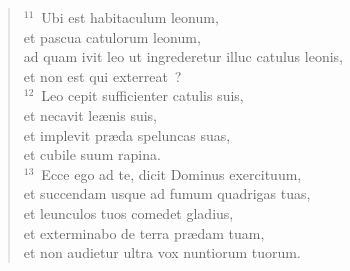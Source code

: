 \begin{flushleft}
\begin{verse}
${}^{11}$~Ubi est habitaculum leonum,\\ et pascua catulorum leonum,\\ ad quam ivit leo ut ingrederetur illuc catulus leonis,\\ et non est qui exterreat~?\\
${}^{12}$~Leo cepit sufficienter catulis suis,\\ et necavit le\ae nis suis,\\ et implevit pr\ae da speluncas suas,\\ et cubile suum rapina.\\
${}^{13}$~Ecce ego ad te, dicit Dominus exercituum,\\ et succendam usque ad fumum quadrigas tuas,\\ et leunculos tuos comedet gladius,\\ et exterminabo de terra pr\ae dam tuam,\\ et non audietur ultra vox nuntiorum tuorum.\end{verse}\end{flushleft}


